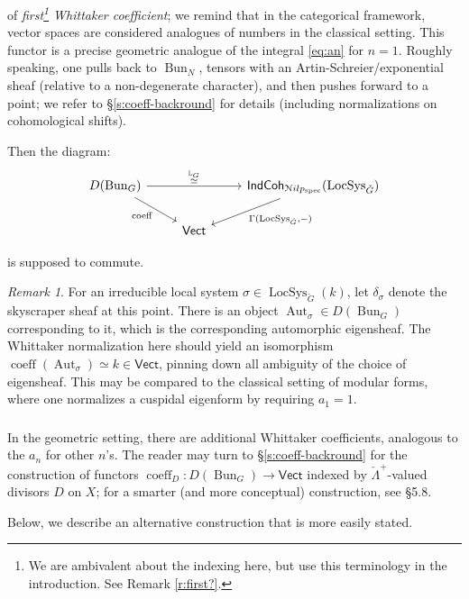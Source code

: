 \documentclass[reqno,11pt]{amsart}
\numberwithin{equation}{subsection}
\theoremstyle{remark}
\newtheorem{rem}[thm]{Remark}
\newcommand{\bL}{{\mathbb L}}
\newcommand{\sN}{{\EuScript N}}
\newcommand{\on}{\operatorname}
\newcommand{\Aut}{\on{Aut}}
\newcommand{\Vect}{\mathsf{Vect}}
\newcommand{\Bun}{\on{Bun}}
\newcommand{\LocSys}{\on{LocSys}}
\newcommand{\IndCoh}{\mathsf{IndCoh}}
\newcommand{\coeff}{\on{coeff}}
\newcommand{\Nilp}{\sN ilp}
\begin{document}
\noindent of \emph{first\footnote{We are ambivalent about the indexing
here, but use this terminology in the introduction. See Remark \ref{r:first?}.}
Whittaker coefficient}; we remind that
in the categorical framework, vector spaces are considered analogues of numbers
in the classical setting.
This functor is a precise geometric
analogue of the integral \eqref{eq:an} for $n = 1$. Roughly speaking,
one pulls back to $\Bun_N$, tensors with an Artin-Schreier/exponential
sheaf (relative to a non-degenerate character), 
and then pushes forward to a point; we refer to \S \ref{s:coeff-backround}
for details (including normalizations on cohomological shifts).

Then the diagram:
%
\[
\begin{tikzcd}
D(\Bun_G) 
\arrow[rr,"\overset{\bL_G}{\simeq}"] 
\arrow[dr,"\coeff",swap]
&&
\IndCoh_{\Nilp_{\on{spec}}}(\LocSys_{\check{G}})
\arrow[dl,"{\Gamma(\LocSys_{\check{G}},-)}"]
\\
&
\Vect
\end{tikzcd}
\]

\noindent is supposed to commute.

\begin{rem}

For an irreducible local system $\sigma \in \LocSys_{\check{G}}(k)$, 
let $\delta_{\sigma}$ denote the skyscraper sheaf at this point.
There is an object $\Aut_{\sigma} \in D(\Bun_G)$ corresponding to it,
which is the corresponding automorphic eigensheaf. The Whittaker
normalization here should yield an isomorphism $\coeff(\Aut_{\sigma}) \simeq k
\in \Vect$, pinning down all ambiguity of the choice of eigensheaf.
This may be compared to the classical setting of modular forms,
where one normalizes a cuspidal eigenform by requiring $a_1 = 1$.

\end{rem}

\subsubsection{}

In the geometric setting, there are additional Whittaker coefficients,
analogous to the $a_n$ for other $n$'s. The reader may turn to 
\S \ref{s:coeff-backround} for the construction of functors
$\coeff_D:D(\Bun_G) \to \Vect$ indexed by $\check{\Lambda}^+$-valued
divisors $D$ on $X$; for a smarter (and more conceptual) construction, see
\cite{dennis-laumonconf} \S 5.8.

Below, we describe an alternative construction that is more easily stated. 
\end{document}
